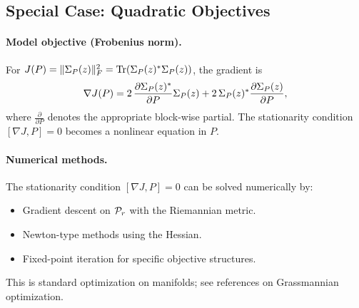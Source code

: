 \subsection{Special Case: Quadratic Objectives}
\label{subsec:quadratic-objectives}

\paragraph{Model objective (Frobenius norm).}
\label{ex:frobenius-objective}
For $J(P) = \|\Sigma_{P}(z)\|_F^2 = \mathrm{Tr}(\Sigma_{P}(z)^* \Sigma_{P}(z))$, the gradient is
\[
\nabla J(P) = 2 \, \frac{\partial \Sigma_{P}(z)^*}{\partial P} \Sigma_{P}(z) + 2 \, \Sigma_{P}(z)^* \frac{\partial \Sigma_{P}(z)}{\partial P},
\]
where $\frac{\partial}{\partial P}$ denotes the appropriate block-wise partial.
The stationarity condition $[\nabla J, P] = 0$ becomes a nonlinear equation in $P$.

\paragraph{Numerical methods.}
The stationarity condition $[\nabla J, P] = 0$ can be solved numerically by:
\begin{itemize}[itemsep=0.2em]
\item Gradient descent on $\mathcal{P}_{r}$ with the Riemannian metric.
\item Newton-type methods using the Hessian.
\item Fixed-point iteration for specific objective structures.
\end{itemize}
This is standard optimization on manifolds; see references on Grassmannian optimization.
